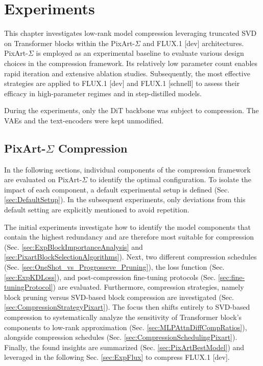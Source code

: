 
\chapter{Experiments}
\label{sec:Experiments}
This chapter investigates low-rank model compression leveraging truncated \gls{SVD} on Transformer blocks within the PixArt-$\Sigma$ and FLUX.1 {[dev]} architectures. PixArt-$\Sigma$ is employed as an experimental baseline to evaluate various design choices in the compression framework. Its relatively low parameter count enables rapid iteration and extensive ablation studies. Subsequently, the most effective strategies are applied to FLUX.1 {[dev]} and FLUX.1 {[schnell]} to assess their efficacy in high-parameter regimes and in step-distilled models. 

During the experiments, only the \gls{DiT} backbone was subject to compression. The \gls{VAE}s and the text-encoders were kept unmodified.
\section{PixArt-$\Sigma$ Compression}
\label{sec:PixArtExp}

In the following sections, individual components of the compression framework are evaluated on PixArt-$\Sigma$ to identify the optimal configuration. To isolate the impact of each component, a default experimental setup is defined (Sec. \ref{sec:DefaultSetup}). In the subsequent experiments, only deviations from this default setting are explicitly mentioned to avoid repetition.

 The initial experiments investigate how to identify the model components that contain the highest redundancy and are therefore most suitable for compression (Sec. \ref{sec:ExpBlockImportanceAnalysis} and \ref{sec:PixartBlockSelectionAlgorithms}). Next,  two different compression schedules (Sec. \ref{sec:OneShot_vs_Progrosseve_Pruning}), the loss function (Sec. \ref{sec:ExpKDLoss}), and  post-compression fine-tuning protocols (Sec. \ref{sec:fine-tuningProtocol}) are evaluated. Furthermore, compression strategies, namely block pruning versus \gls{SVD}-based block compression are investigated (Sec. \ref{sec:CompressionStrategyPixart}). The focus then shifts entirely to \gls{SVD}-based compression to systematically analyze the sensitivity of Transformer block's components to low-rank approximation (Sec. \ref{sec:MLPAttnDiffCompRatios}), alongside compression schedules (Sec. \ref{sec:CompressionSchedulingPixart}). Finally, the found insights are summarized (Sec. \ref{sec:PixArtBestModel}) and leveraged in the following Sec. \ref{sec:ExpFlux} to compress FLUX.1 {[dev]}.

